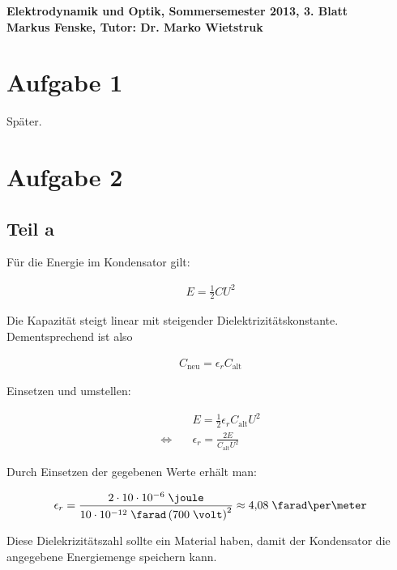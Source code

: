 \documentclass[a4paper,german,12pt,smallheadings]{scrartcl}
\begin{document}
\begin{center}
\bfseries %
\sffamily %
\vspace{-40pt}
Elektrodynamik und Optik, Sommersemester 2013, 3. Blatt \\
Markus Fenske, Tutor: Dr. Marko Wietstruk
\vspace{-10pt}
\end{center}
\section*{Aufgabe 1}

Später.

\section*{Aufgabe 2}
\subsection*{Teil a}

Für die Energie im Kondensator gilt:

\begin{align*}
  E = \frac{1}{2} C U^2
\end{align*}

Die Kapazität steigt linear mit steigender Dielektrizitätskonstante. Dementsprechend ist also

\begin{align*}
  C_{\text{neu}} = \epsilon_r C_\text{alt}
\end{align*}

Einsetzen und umstellen:

\begin{align*}
  &E = \frac{1}{2} \epsilon_r C_\text{alt} U^2 \\
  \Leftrightarrow \quad &\epsilon_r = \frac{2E}{C_\text{alt} U^2}
\end{align*}

Durch Einsetzen der gegebenen Werte erhält man:

\begin{align*}
  \epsilon_r = \frac{2 \cdot 10 \cdot 10^{-6}\;\joule}{10 \cdot 10^{-12}\; \farad \left(700\; \volt\right)^2} \approx 4{,}08\; \farad\per\meter
\end{align*}

Diese Dielekrizitätszahl sollte ein Material haben, damit der Kondensator die
angegebene Energiemenge speichern kann.
\end{document}

